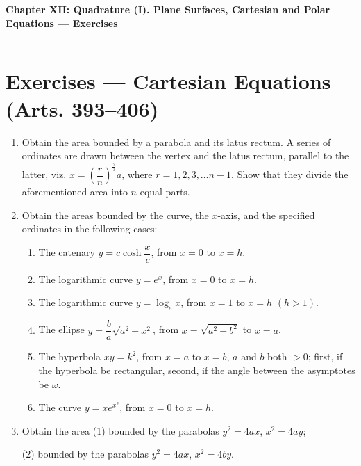 \documentclass[11pt, a4paper]{article}
\begin{document}
\newpage

\begin{center}
    {\LARGE \bfseries \color{accent} Chapter XII: Quadrature (I). Plane Surfaces, Cartesian and Polar Equations --- Exercises}\\
    \vspace{0.2cm}
    {\color{accent}\rule{0.55\linewidth}{0.8pt}}
\end{center}
\vspace{0.35cm}

\section*{Exercises --- Cartesian Equations (Arts. 393--406)}

\begin{enumerate}[leftmargin=2em]

\item Obtain the area bounded by a parabola and its latus rectum. A series of ordinates are drawn between the vertex and the latus rectum, parallel to the latter, viz. $x=\left(\dfrac{r}{n}\right)^{\frac23}a$, where $r=1,2,3,\dots n-1$. Show that they divide the aforementioned area into $n$ equal parts.

\item Obtain the areas bounded by the curve, the $x$-axis, and the specified ordinates in the following cases:
\begin{enumerate}[label=(\alph*)]
\item The catenary $y=c\cosh\dfrac{x}{c}$, from $x=0$ to $x=h$.
\item The logarithmic curve $y=e^x$, from $x=0$ to $x=h$.
\item The logarithmic curve $y=\log_ex$, from $x=1$ to $x=h$ $(h>1)$.
\item The ellipse $y=\dfrac{b}{a}\sqrt{a^2-x^2}$, from $x=\sqrt{a^2-b^2}$ to $x=a$.
\item The hyperbola $xy=k^2$, from $x=a$ to $x=b$, $a$ and $b$ both $>0$; first, if the hyperbola be rectangular, second, if the angle between the asymptotes be $\omega$.
\item The curve $y=xe^{x^2}$, from $x=0$ to $x=h$.
\end{enumerate}

\item Obtain the area (1) bounded by the parabolas $y^2=4ax$, $x^2=4ay$;

(2) bounded by the parabolas $y^2=4ax$, $x^2=4by$.


\end{enumerate}
\end{document}
